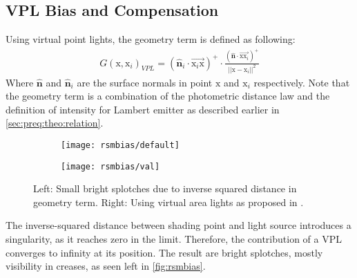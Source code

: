 \documentclass[thesis.tex]{subfiles}
\begin{document}
\subsection{VPL Bias and Compensation} \label{sec:fig:rsmbias}
Using virtual point lights, the geometry term is defined as following:
\begin{align}
G(\mathrm{x}, \mathrm{x}_i)_{VPL} = (\hat{\mathbf{n}}_i \cdot \overrightarrow{\mathrm{x}_i\mathrm{x}})^+ \cdot \frac{(\hat{\mathbf{n}} \cdot \overrightarrow{\mathrm{x}\mathrm{x}_i} )^+}{||\mathrm{x} - \mathrm{x}_i||^2}
\end{align}
Where $\hat{\mathbf{n}}$ and $\hat{\mathbf{n}}_i$ are the surface normals in point $\mathrm{x}$ and $\mathrm{x}_i$ respectively.
Note that the geometry term is a combination of the photometric distance law and the definition of intensity for Lambert emitter as described earlier in \autoref{sec:preq:theo:relation}. %
\\
\begin{figure}[h]
\centering
\begin{subfigure}[b]{0.48\textwidth}
	\texttt{[image: rsmbias/default]}
\end{subfigure}
\begin{subfigure}[b]{0.48\textwidth}
	\texttt{[image: rsmbias/val]}
\end{subfigure}
\caption{Left: Small bright splotches due to inverse squared distance in geometry term. Right: Using virtual area lights as proposed in \cite{bib:LightskinPaper}.}\label{fig:rsmbias}
\end{figure}
The inverse-squared distance between shading point and light source introduces a singularity, as it reaches zero in the limit.
Therefore, the contribution of a VPL converges to infinity at its position.
The result are bright splotches, mostly visibility in creases, as seen left in \autoref{fig:rsmbias}.
\end{document}
